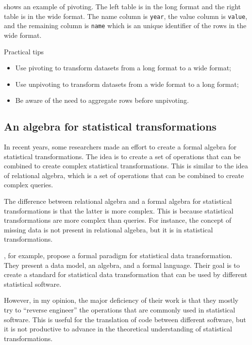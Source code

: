  shows an example of pivoting.  The left table is in the long format and
the right table is in the wide format.  The name column is \texttt{year}, the value column
is \texttt{value}, and the remaining column is \texttt{name} which is an unique identifier
of the rows in the wide format.

\begin{hlbox}{Practical tips}
  \begin{itemize}
    \item Use pivoting to transform datasets from a long format to a wide format;
    \item Use unpivoting to transform datasets from a wide format to a long format;
    \item Be aware of the need to aggregate rows before unpivoting.
  \end{itemize}
\end{hlbox}

\subsection{An algebra for statistical transformations}

In recent years, some researchers made an effort to create a formal algebra for
statistical transformations.  The idea is to create a set of operations that can be
combined to create complex statistical transformations.  This is similar to the idea of
relational algebra, which is a set of operations that can be combined to create complex
queries.

The difference between relational algebra and a formal algebra for statistical
transformations is that the latter is more complex.  This is because statistical
transformations are more complex than queries.  For instance, the concept of missing data
is not present in relational algebra, but it is in statistical transformations.

\textcite{Song2021}, for example, propose a formal paradigm for statistical data
transformation.  They present a data model, an algebra, and a formal language.  Their goal
is to create a standard for statistical data transformation that can be used by different
statistical software.

However, in my opinion, the major deficiency of their work is that they mostly try to
``reverse engineer'' the operations that are commonly used in statistical software.  This
is useful for the translation of code between different software, but it is not productive
to advance in the theoretical understanding of statistical transformations.

